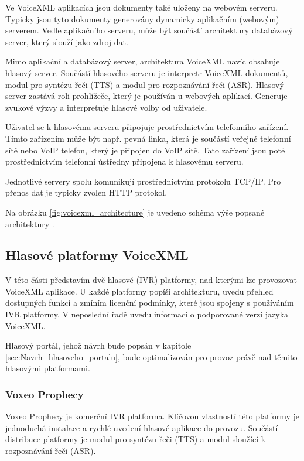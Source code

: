 \documentclass[ing,male,java,dept460,twoside]{diploma}						%
\begin{document}
Ve VoiceXML aplikacích jsou dokumenty také uloženy na webovém serveru. Typicky jsou tyto dokumenty generovány dynamicky aplikačním (webovým) serverem. Vedle aplikačního serveru, může být součástí architektury databázový server, který slouží jako zdroj dat.

Mimo aplikační a databázový server, architektura VoiceXML navíc obsahuje hlasový server. Součástí hlasového serveru je interpretr VoiceXML dokumentů, modul pro syntézu řeči (TTS) a modul pro rozpoznávání řeči (ASR). Hlasový server zastává roli prohlížeče, který je používán u webových aplikací. Generuje zvukové výzvy a interpretuje hlasové volby od uživatele.

Uživatel se k hlasovému serveru připojuje prostřednictvím telefonního zařízení. Tímto zařízením může být např. pevná linka, která je součástí veřejné telefonní sítě nebo VoIP telefon, který je připojen do VoIP sítě. Tato zařízení jsou poté prostřednictvím telefonní ústředny připojena k hlasovému serveru.

Jednotlivé servery spolu komunikují prostřednictvím protokolu TCP/IP. Pro přenos dat je typicky zvolen HTTP protokol.

Na obrázku \ref{fig:voicexml_architecture} je uvedeno schéma výše popsané architektury \cite{vxml_rychlokurz}.


\subsection{Hlasové platformy VoiceXML}
V této části představím dvě hlasové (IVR) platformy, nad kterými lze provozovat VoiceXML aplikace. U každé platformy popíši architekturu, uvedu přehled dostupných funkcí a zmíním licenční podmínky, které jsou spojeny s používáním IVR platformy. V neposlední řadě uvedu informaci o podporované verzi jazyka VoiceXML.

Hlasový portál, jehož návrh bude popsán v kapitole \ref{sec:Navrh_hlasoveho_portalu}, bude optimalizován pro provoz právě nad těmito hlasovými platformami.

\subsubsection{Voxeo Prophecy}
\label{sec:Voxeo_interpreter}
Voxeo Prophecy je komerční IVR platforma. Klíčovou vlastností této platformy je jednoduchá instalace a rychlé uvedení hlasové aplikace do provozu. Součástí distribuce platformy je modul pro syntézu řeči (TTS) a modul sloužící k rozpoznávání řeči (ASR).
\end{document}
